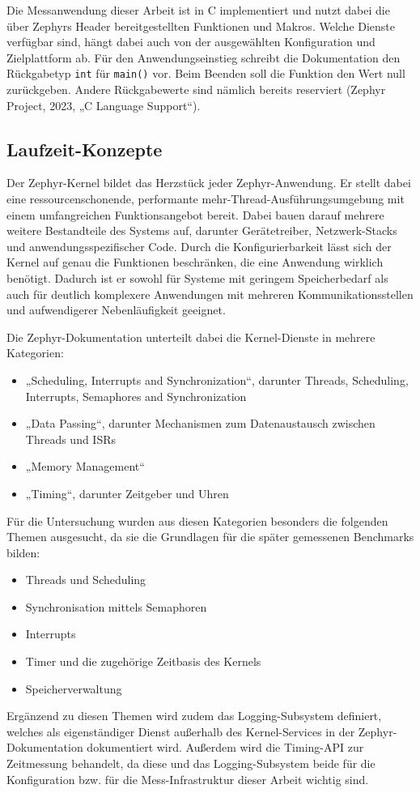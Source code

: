 Die Messanwendung dieser Arbeit ist in C implementiert und nutzt dabei die über Zephyrs Header bereitgestellten Funktionen und Makros. Welche Dienste verfügbar sind, hängt dabei auch von der ausgewählten Konfiguration und Zielplattform ab. Für den Anwendungseinstieg schreibt die Dokumentation den Rückgabetyp \lstinline[style=fileinline]|int| für \lstinline[style=fileinline]|main()| vor. Beim Beenden soll die Funktion den Wert null zurückgeben. Andere Rückgabewerte sind nämlich bereits reserviert (Zephyr Project, 2023, „C Language Support“).

\subsection{Laufzeit-Konzepte}
Der Zephyr-Kernel bildet das Herzstück jeder Zephyr-Anwendung. Er stellt dabei eine ressourcenschonende, performante mehr-Thread-Ausführungsumgebung mit einem umfangreichen Funktionsangebot bereit. Dabei bauen darauf mehrere weitere Bestandteile des Systems auf, darunter Gerätetreiber, Netzwerk-Stacks und anwendungsspezifischer Code. Durch die Konfigurierbarkeit lässt sich der Kernel auf genau die Funktionen beschränken, die eine Anwendung wirklich benötigt. Dadurch ist er sowohl für Systeme mit geringem Speicherbedarf als auch für deutlich komplexere Anwendungen mit mehreren Kommunikationsstellen und aufwendigerer Nebenläufigkeit geeignet.

Die Zephyr-Dokumentation unterteilt dabei die Kernel-Dienste in mehrere Kategorien:

\begin{itemize}
\item „Scheduling, Interrupts and Synchronization“, darunter Threads, Scheduling, Interrupts, Semaphores and Synchronization
\item „Data Passing“, darunter Mechanismen zum Datenaustausch zwischen Threads und ISRs
\item „Memory Management“
\item „Timing“, darunter Zeitgeber und Uhren
\end{itemize}
Für die Untersuchung wurden aus diesen Kategorien besonders die folgenden Themen ausgesucht, da sie die Grundlagen für die später gemessenen Benchmarks bilden:

\begin{itemize}
\item Threads und Scheduling
\item Synchronisation mittels Semaphoren
\item Interrupts
\item Timer und die zugehörige Zeitbasis des Kernels
\item Speicherverwaltung
\end{itemize}
Ergänzend zu diesen Themen wird zudem das Logging-Subsystem definiert, welches als eigenständiger Dienst außerhalb des Kernel-Services in der Zephyr-Dokumentation dokumentiert wird. Außerdem wird die Timing-API zur Zeitmessung behandelt, da diese und das Logging-Subsystem beide für die Konfiguration bzw. für die Mess-Infrastruktur dieser Arbeit wichtig sind.

